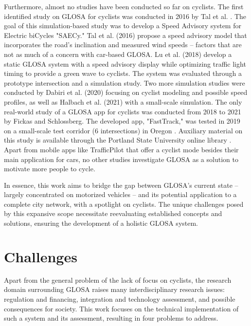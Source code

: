 Furthermore, almost no studies have been conducted so far on cyclists. The first identified study on GLOSA for cyclists was conducted in 2016 by Tal et al. \cite{tal_vehicular-communications-based_2016}. The goal of this simulation-based study was to develop a Speed Advisory system for Electric biCycles "SAECy." Tal et al. (2016) \cite{tal_vehicular-communications-based_2016} propose a speed advisory model that incorporates the road's inclination and measured wind speeds -- factors that are not as much of a concern with car-based GLOSA. Lu et al. (2018) \cite{lu_enhancement_2018} develop a static GLOSA system with a speed advisory display while optimizing traffic light timing to provide a green wave to cyclists. The system was evaluated through a prototype intersection and a simulation study. Two more simulation studies were conducted by Dabiri et al. (2020) \cite{dabiri_optimized_2020} focusing on cyclist modeling and possible speed profiles, as well as Halbach et al. (2021) \cite{halbach_cooperative_2021} with a small-scale simulation. The only real-world study of a GLOSA app for cyclists was conducted from 2018 to 2021 by Fickas and Schlossberg. The developed app, "FastTrack," was tested in 2019 on a small-scale test corridor (6 intersections) in Oregon \cite{fickas_fast_2019}. Auxiliary material on this study is available through the Portland State University online library \cite{fickas_green_2021, fickas_using_2021, fickas_riding_2019, fickas_data_2021, fickas_project_2018}. Apart from mobile apps like TrafficPilot that offer a cyclist mode besides their main application for cars, no other studies investigate GLOSA as a solution to motivate more people to cycle. 

In essence, this work aims to bridge the gap between GLOSA's current state -- largely concentrated on motorized vehicles -- and its potential application to a complete city network, with a spotlight on cyclists. The unique challenges posed by this expansive scope necessitate reevaluating established concepts and solutions, ensuring the development of a holistic GLOSA system.

\section{Challenges}

Apart from the general problem of the lack of focus on cyclists, the research domain surrounding GLOSA raises many interdisciplinary research issues: regulation and financing, integration and technology assessment, and possible consequences for society. This work focuses on the technical implementation of such a system and its assessment, resulting in four problems to address.

